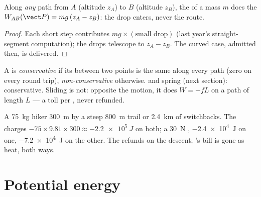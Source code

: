 \begin{proposition}\label{prop:g12:work-and-energy:weight}
Along \emph{any} path from $A$ (altitude $z_A$) to $B$ (altitude
$z_B$), the  of a mass $m$ does the 
$W_{AB}(\vect P) = mg\,(z_A - z_B)$: the drop enters, never the route.
\end{proposition}

\begin{proof}
Each short step contributes $mg \times (\text{small drop})$ (last
year's straight-segment computation); the drops telescope to
$z_A - z_B$. The curved case, admitted then, is delivered.
\end{proof}

\begin{definition}\label{def:g12:work-and-energy:conservative}
A  is \emph{conservative} if its 
between two points is the same along every path (zero on every round
trip), \emph{non-conservative}
otherwise.  and spring  (next section): conservative.
Sliding  is not: opposite the motion, it does $W = -fL$ on a
path of length $L$ --- a toll per , never refunded.
\end{definition}

\begin{example}\label{ex:g12:work-and-energy:trails}
A \qty{75}{kg} hiker  \qty{300}{m} by a steep \qty{800}{m} trail
or \qty{2.4}{km} of switchbacks. The  charges
$-75 \times 9.81 \times 300 \approx \qty{-2.2e5}{J}$ on both; a
\qty{30}{N}  , \qty{-2.4e4}{J} on one, \qty{-7.2e4}{J}
on the other. The  refunds on the descent; 's bill is
gone as heat, both ways.
\end{example}

\section{Potential energy}

